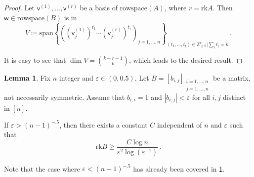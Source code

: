 \documentclass[12pt]{amsart}
\theoremstyle{definition}
\newtheorem{lm}[thm]{Lemma}
\newcommand{\Z}{\mathbb{Z}}
\newcommand{\vv}{\mathsf{v}}
\newcommand{\vw}{\mathsf{w}}
\newcommand{\spn}{\mathrm{span}}
\newcommand{\rk}{\mathrm{rk}}
\begin{document}
\begin{proof}
Let $\vv^{(1)}, \ldots, \vv^{(r)} $ be a basis of $\mathrm{rowspace}(A)$, where $r = \rk A$.
Then $\vw \in \mathrm{rowspace}(B)$ is in 
$$V \coloneqq \spn \left\{ \left((\vv_j^{(1)})^{t_1} \cdots (\vv_j^{(r)})^{t_r} \right)_{j = 1, \ldots, n}\right\}_{(t_1, \ldots , t_t) \in \Z_{\geq 0}^r | \sum_i t_i = k } \, .$$

It is easy to see that $\dim V = \binom{k + r - 1}{k}$, which leads to the desired result.
\end{proof}

\begin{lm}\label{lm:JL_3}
Fix $n$ integer and $\varepsilon \in (0, 0.5)$.
Let $B = [b_{i, j}]_{\substack{i = 1, \ldots , n \\ j = 1, \ldots , n}}$ be a matrix, not necessarily symmetric.
Assume that $b_{i, i} = 1$ and $|b_{i, j}| < \varepsilon $ for all $i, j$ distinct in $[n]$.

If $\varepsilon > (n-1)^{-.5}$, then there exists a constant $C$ independent of $n$ and $\varepsilon$ such that 
$$ \rk B \geq \frac{C \log n}{\varepsilon^2 \log (\varepsilon^{-1})}\, . $$
\end{lm}

Note that the case where $\varepsilon < (n-1)^{-.5}$ has already been covered in \cref{lm:JL_3}.
\end{document}
